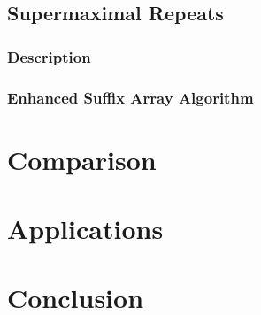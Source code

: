 \documentclass[a4paper,10pt]{article}
\begin{document}
\subsection*{Supermaximal Repeats}

\subsubsection*{Description}

\subsubsection*{Enhanced Suffix Array Algorithm}


\section*{Comparison}

\section*{Applications}


\section*{Conclusion}



\end{document}
